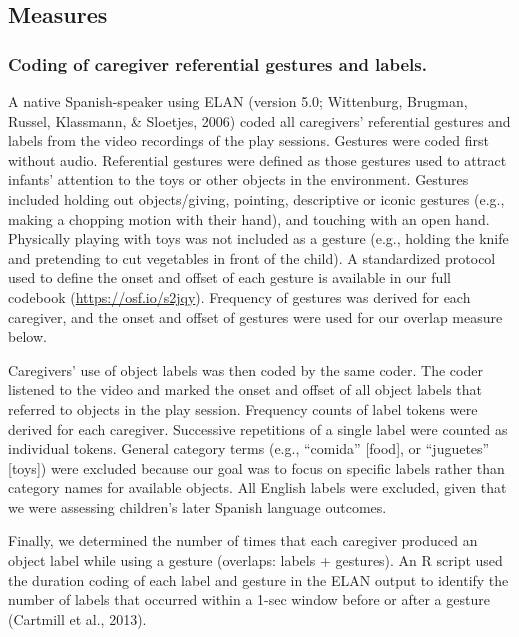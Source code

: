 \documentclass[
  english,
  man,floatsintext]{apa6}
\begin{document}
\hypertarget{measures}{%
\subsection{Measures}\label{measures}}

\hypertarget{coding-of-caregiver-referential-gestures-and-labels.}{%
\subsubsection{Coding of caregiver referential gestures and labels.}\label{coding-of-caregiver-referential-gestures-and-labels.}}

A native Spanish-speaker using ELAN (version 5.0; Wittenburg, Brugman, Russel, Klassmann, \& Sloetjes, 2006) coded all caregivers' referential gestures and labels from the video recordings of the play sessions. Gestures were coded first without audio. Referential gestures were defined as those gestures used to attract infants' attention to the toys or other objects in the environment. Gestures included holding out objects/giving, pointing, descriptive or iconic gestures (e.g., making a chopping motion with their hand), and touching with an open hand. Physically playing with toys was not included as a gesture (e.g., holding the knife and pretending to cut vegetables in front of the child). A standardized protocol used to define the onset and offset of each gesture is available in our full codebook (\url{https://osf.io/s2jqy}). Frequency of gestures was derived for each caregiver, and the onset and offset of gestures were used for our overlap measure below.

Caregivers' use of object labels was then coded by the same coder. The coder listened to the video and marked the onset and offset of all object labels that referred to objects in the play session. Frequency counts of label tokens were derived for each caregiver. Successive repetitions of a single label were counted as individual tokens. General category terms (e.g., \enquote{comida} {[}food{]}, or \enquote{juguetes} {[}toys{]}) were excluded because our goal was to focus on specific labels rather than category names for available objects. All English labels were excluded, given that we were assessing children's later Spanish language outcomes.

Finally, we determined the number of times that each caregiver produced an object label while using a gesture (overlaps: labels + gestures). An R script used the duration coding of each label and gesture in the ELAN output to identify the number of labels that occurred within a 1-sec window before or after a gesture (Cartmill et al., 2013).
\end{document}
